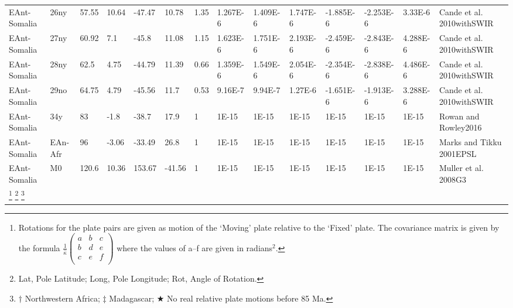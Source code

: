\begin{landscape}
\begin{longtable}{@{}lllllllllllll>{\scriptsize}p{3.1cm}@{}}
EAnt-Somalia & 26ny & 57.55 & 10.64 & -47.47 & 10.78 & 1.35 & 1.267E-6 & 1.409E-6 & 1.747E-6 & -1.885E-6 & -2.253E-6 & 3.33E-6 & Cande et al. 2010withSWIR \\
EAnt-Somalia & 27ny & 60.92 & 7.1 & -45.8 & 11.08 & 1.15 & 1.623E-6 & 1.751E-6 & 2.193E-6 & -2.459E-6 & -2.843E-6 & 4.288E-6 & Cande et al. 2010withSWIR \\
EAnt-Somalia & 28ny & 62.5 & 4.75 & -44.79 & 11.39 & 0.66 & 1.359E-6 & 1.549E-6 & 2.054E-6 & -2.354E-6 & -2.838E-6 & 4.486E-6 & Cande et al. 2010withSWIR \\
EAnt-Somalia & 29no & 64.75 & 4.79 & -45.56 & 11.7 & 0.53 & 9.16E-7 & 9.94E-7 & 1.27E-6 & -1.651E-6 & -1.913E-6 & 3.288E-6 & Cande et al. 2010withSWIR \\
EAnt-Somalia & 34y & 83 & -1.8 & -38.7 & 17.9 & 1 & 1E-15 & 1E-15 & 1E-15 & 1E-15 & 1E-15 & 1E-15 & Rowan and Rowley2016 \\
EAnt-Somalia & EAn-Afr & 96 & -3.06 & -33.49 & 26.8 & 1 & 1E-15 & 1E-15 & 1E-15 & 1E-15 & 1E-15 & 1E-15 & Marks and Tikku 2001EPSL \\
EAnt-Somalia & M0 & 120.6 & 10.36 & 153.67 & -41.56 & 1 & 1E-15 & 1E-15 & 1E-15
& 1E-15 & 1E-15 & 1E-15 & Muller et al. 2008G3 \\* \bottomrule
\let\thefootnote\relax\footnote{Rotations for the plate pairs are given as
motion of the `Moving' plate relative to the `Fixed' plate. The covariance
matrix is given by the formula $\frac{1}{\hat{\kappa}}\left( {\begin{array}{ccc}
   a & b & c\\
   b & d & e\\
   c & e & f\\ \end{array}} \right)$ where the values of a–f are given in
   radians$^2$.}
\let\thefootnote\relax\footnote{Lat, Pole Latitude; Long, Pole Longitude; Rot,
Angle of Rotation.}
\let\thefootnote\relax\footnote{$\dagger$ Northwestern Africa; $\ddagger$
Madagascar; $\bigstar$ No real relative plate motions before 85 Ma.}
\end{longtable}
\end{landscape}

